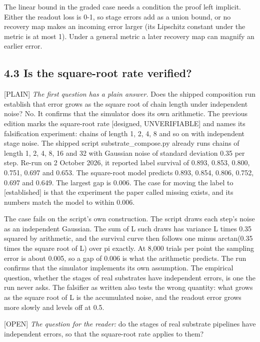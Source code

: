 \documentclass[11pt]{article}
\newcommand{\register}[1]{{\ttfamily\small #1}}
\begin{document}
The linear bound in the graded case needs a condition the proof left implicit. Either the readout loss is 0-1, so stage errors add as a union bound, or no recovery map makes an incoming error larger (its Lipschitz constant under the metric is at most 1). Under a general metric a later recovery map can magnify an earlier error.

\subsection*{4.3 Is the square-root rate verified?}

\register{[PLAIN]} \emph{The first question has a plain answer.} Does the shipped composition run establish that error grows as the square root of chain length under independent noise? No. It confirms that the simulator does its own arithmetic. The previous edition marks the square-root rate [designed, UNVERIFIABLE] and names its falsification experiment: chains of length 1, 2, 4, 8 and so on with independent stage noise. The shipped script substrate\_compose.py already runs chains of length 1, 2, 4, 8, 16 and 32 with Gaussian noise of standard deviation 0.35 per step. Re-run on 2 October 2026, it reported label survival of 0.893, 0.853, 0.800, 0.751, 0.697 and 0.653. The square-root model predicts 0.893, 0.854, 0.806, 0.752, 0.697 and 0.649. The largest gap is 0.006. The case for moving the label to [established] is that the experiment the paper called missing exists, and its numbers match the model to within 0.006.

The case fails on the script's own construction. The script draws each step's noise as an independent Gaussian. The sum of L such draws has variance L times 0.35 squared by arithmetic, and the survival curve then follows one minus arctan(0.35 times the square root of L) over pi exactly. At 8,000 trials per point the sampling error is about 0.005, so a gap of 0.006 is what the arithmetic predicts. The run confirms that the simulator implements its own assumption. The empirical question, whether the stages of real substrates have independent errors, is one the run never asks. The falsifier as written also tests the wrong quantity: what grows as the square root of L is the accumulated noise, and the readout error grows more slowly and levels off at 0.5.

\register{[OPEN]} \emph{The question for the reader:} do the stages of real substrate pipelines have independent errors, so that the square-root rate applies to them?
\end{document}
